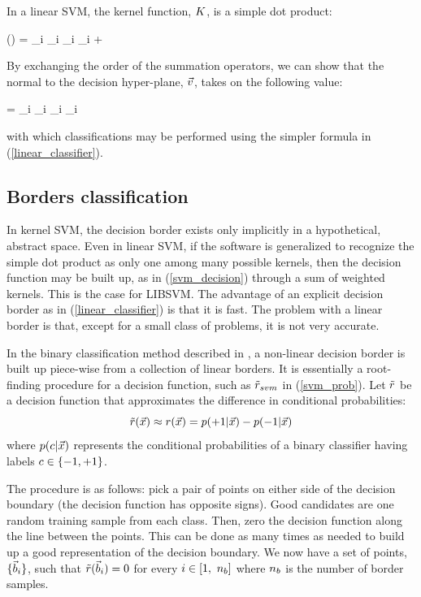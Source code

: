 In a linear SVM, the kernel function, $K$, is a simple dot product:
\begin{eqnnon}
	\svmdecision(\testpoint) = \sum_i \svmcoeff_i \classlabel_i \testpoint \cdot \sample_i + \svmborderconst
\end{eqnnon}
By exchanging the order of the summation operators, 
we can show that the normal to the
decision hyper-plane, $\vec v$, takes on the following value:
\begin{eqnnon}
	\bordernormal = \sum_i \svmcoeff_i \classlabel_i \sample_i
\end{eqnnon}
with which classifications may be performed using the simpler formula in 
(\ref{linear_classifier}).


\subsection{Borders classification}

\label{border_method}

In kernel SVM, the decision border exists only implicitly in a hypothetical,
abstract space. Even in linear SVM, if the software is generalized to 
recognize the simple dot product as only one among many possible kernels,
then the decision function may be built up, as in (\ref{svm_decision})
through a sum of weighted kernels. This is the case for LIBSVM.
The advantage of an explicit decision border as in 
(\ref{linear_classifier}) is that it is fast. 
The problem with a linear border is that, except for a
small class of problems, it is not very accurate.

In the binary classification method described in \citet{Mills2011},
a non-linear decision border is built up piece-wise from a collection of linear borders.
It is essentially a root-finding procedure for a decision function,
such as $\tilde r_{svm}$ in (\ref{svm_prob}).
Let $\tilde r$ be a decision function
that approximates the difference in conditional probabilities:
\begin{equation}
	\tilde r(\vec {x}) \approx r(\vec {x}) = 
	p(+1|\vec {x}) - p(-1|\vec {x})
	\label{rdef}
\end{equation}
where $p(c|\vec {x})$ represents the conditional probabilities of
a binary classifier having labels $c \in \lbrace -1, +1 \rbrace$.

The procedure is as follows: pick a pair of points on either side of the decision
boundary (the decision function has opposite signs). Good candidates are one
random training sample from each class. Then, zero the decision function
along the line between the points. This can be done as many times as needed
to build up a good representation of the decision boundary.
We now have a set of points, $\lbrace \vec b_i \rbrace$, such that
$\tilde r(\vec b_i)=0$ for every $i \in [1,~n_b]$ where
$n_b$ is the number of border samples.

